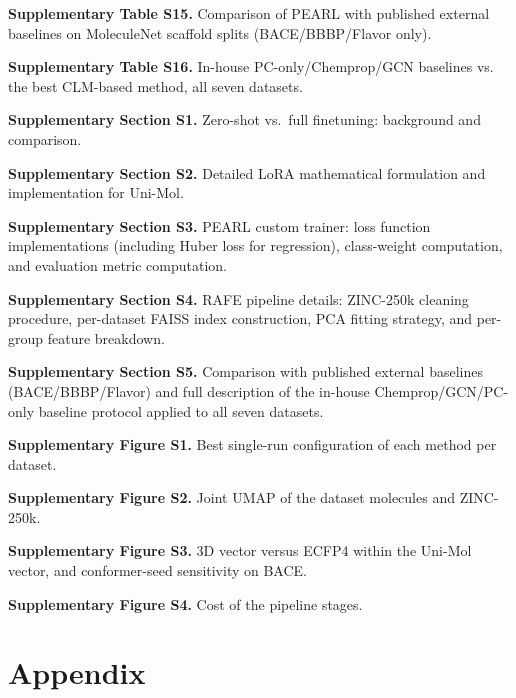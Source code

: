 \documentclass[pdflatex,sn-basic]{sn-jnl}%
\begin{document}
\noindent \textbf{Supplementary Table S15.} Comparison of PEARL with published external baselines on MoleculeNet scaffold splits (BACE/BBBP/Flavor only).

\noindent \textbf{Supplementary Table S16.} In-house PC-only/Chemprop/GCN baselines vs. the best CLM-based method, all seven datasets.

\noindent\textbf{Supplementary Section S1.} Zero-shot vs.\ full finetuning: background and comparison.

\noindent\textbf{Supplementary Section S2.} Detailed LoRA mathematical formulation and implementation for Uni-Mol.

\noindent\textbf{Supplementary Section S3.} PEARL custom trainer: loss function implementations (including Huber loss for regression), class-weight computation, and evaluation metric computation.

\noindent\textbf{Supplementary Section S4.} RAFE pipeline details: ZINC-250k cleaning procedure, per-dataset FAISS index construction, PCA fitting strategy, and per-group feature breakdown.

\noindent\textbf{Supplementary Section S5.} Comparison with published external baselines (BACE/BBBP/Flavor) and full description of the in-house Chemprop/GCN/PC-only baseline protocol applied to all seven datasets.

\noindent\textbf{Supplementary Figure S1.} Best single-run configuration of each method per dataset.

\noindent\textbf{Supplementary Figure S2.} Joint UMAP of the dataset molecules and ZINC-250k.

\noindent\textbf{Supplementary Figure S3.} 3D vector versus ECFP4 within the Uni-Mol vector, and conformer-seed sensitivity on BACE.

\noindent\textbf{Supplementary Figure S4.} Cost of the pipeline stages.

\section*{Appendix}

\end{document}
